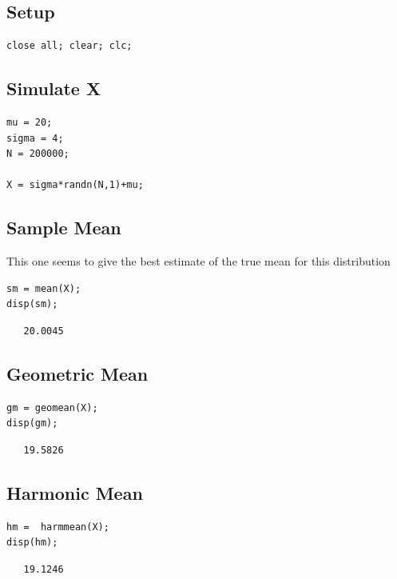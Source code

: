 \documentclass[12pt]{article}
\begin{document}
\subsection*{Setup}
\begin{verbatim}
close all; clear; clc;
\end{verbatim}


\subsection*{Simulate X}

\begin{verbatim}
mu = 20;
sigma = 4;
N = 200000;

X = sigma*randn(N,1)+mu;
\end{verbatim}


\subsection*{Sample Mean}
This one seems to give the best estimate of the true mean for this distribution
\begin{verbatim}
sm = mean(X);
disp(sm);
\end{verbatim}

        \color{lightgray} \begin{verbatim}   20.0045

\end{verbatim} \color{black}
    

\subsection*{Geometric Mean}

\begin{verbatim}
gm = geomean(X);
disp(gm);
\end{verbatim}

        \color{lightgray} \begin{verbatim}   19.5826

\end{verbatim} \color{black}
    

\subsection*{Harmonic Mean}

\begin{verbatim}
hm =  harmmean(X);
disp(hm);
\end{verbatim}

        \color{lightgray} \begin{verbatim}   19.1246

\end{verbatim} \color{black}
    
\end{document}
